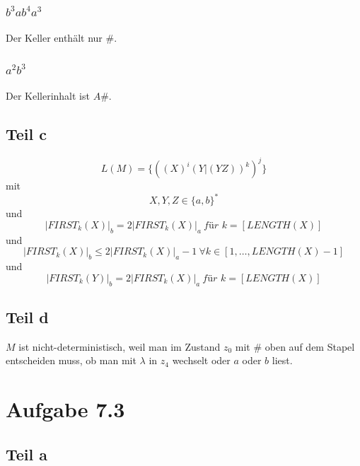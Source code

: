 \documentclass[10pt,a4paper]{article}
\begin{document}
\subsubsection{$b^{3}ab^{4}a^{3}$}

Der Keller enthält nur $\#$.

\subsubsection{$a^{2}b^{3}$}

Der Kellerinhalt ist $A\#$.

\subsection{Teil c}

\begin{equation}
    L(M) = \{ ((X)^{i}(Y | (YZ))^{k})^{j} \}
\end{equation}
mit
\begin{equation}
  X, Y, Z \in \{ a, b \}^{*}
\end{equation}
und
\begin{equation}
  |FIRST_{k}(X)|_{b} = 2|FIRST_{k}(X)|_{a}\ \textit{für $k = [LENGTH(X)]$}
\end{equation}
und
\begin{equation}
  |FIRST_{k}(X)|_{b} \le 2|FIRST_{k}(X)|_{a}  - 1\ \forall k \in [1, \dots, LENGTH(X) - 1]
\end{equation}
und
\begin{equation}
  |FIRST_{k}(Y)|_{b} = 2|FIRST_{k}(X)|_{a}\ \textit{für $k = [LENGTH(X)]$}
\end{equation}

\subsection{Teil d}

$M$ ist nicht-deterministisch, weil man im Zustand $z_{0}$ mit $\#$ oben auf dem Stapel entscheiden muss, ob man mit $\lambda$ in $z_{4}$ wechselt oder $a$ oder $b$ liest.

\section{Aufgabe 7.3}

\subsection{Teil a}
\end{document}
